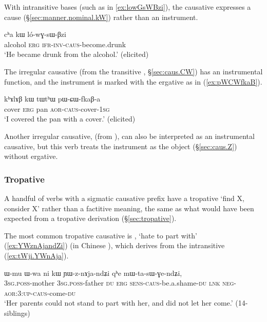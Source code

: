 With intransitive bases (such as  in \ref{ex:lowGsWBzi}), the causative expresses a cause (§\ref{sec:manner.nominal.kW}) rather than an instrument.

\begin{exe}
\ex \label{ex:lowGsWBzi}
\gll cʰa kɯ ló-wɣ-sɯ-βzi \\ 
alcohol \textsc{erg} \textsc{ifr}-\textsc{inv}-\textsc{caus}-become.drunk \\
\glt `He became drunk from the alcohol.' (elicited)
\end{exe}

The irregular causative  (from the transitive , §\ref{sec:caus.CW}) has an instrumental function, and the instrument is marked with the ergative as in (\ref{ex:pWCWfkaB}).

\begin{exe}
\ex \label{ex:pWCWfkaB}
\gll kʰɤlɤβ kɯ tɯtʰɯ pɯ-ɕɯ-fkaβ-a \\
cover \textsc{erg} pan \textsc{aor}-\textsc{caus}-cover-\textsc{1sg} \\
\glt `I covered the pan with a cover.' (elicited)
\end{exe}

Another irregular causative,   (from ), can also be interpreted as an instrumental causative, but this verb treats the instrument as the object (§\ref{sec:caus.Z}) without ergative.

\subsubsection{Tropative} \label{sec:sig.caus.tropative}
 
A handful of verbs with a sigmatic causative prefix have a tropative `find X, consider X' rather than a factitive meaning,  the same as what would have been expected from a   tropative derivation  (§\ref{sec:tropative}).

The most common tropative causative is  , `hate to part with' (\ref{ex:YWznAjandZi}) (in Chinese ), which derives from the intransitive  (\ref{ex:tWji.YWnAja}). 

\begin{exe}
\ex \label{ex:YWznAjandZi}
\gll ɯ-mu ɯ-wa ni kɯ ɲɯ-z-nɤja-ndʑi qʰe mɯ-ta-sɯ-ɣe-ndʑi, \\
\textsc{3sg}.\textsc{poss}-mother \textsc{3sg}.\textsc{poss}-father \textsc{du} \textsc{erg} \textsc{sens}-\textsc{caus}-be.a.shame-\textsc{du} \textsc{lnk} \textsc{neg}-\textsc{aor}:3\flobv{}:\textsc{up}-\textsc{caus}-come-\textsc{du} \\
\glt `Her parents could not stand to part with her, and did not let her come.' (14-siblings)
\end{exe}
 
